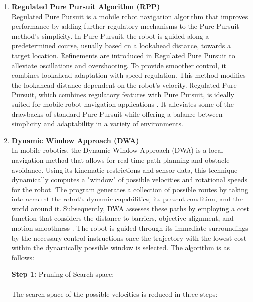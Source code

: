 \documentclass[sigconf]{acmart}
\begin{document}
\begin{enumerate}
    \item \textbf{Regulated Pure Pursuit Algorithm (RPP)}\\
Regulated Pure Pursuit is a mobile robot navigation algorithm that improves performance by adding further regulatory mechanisms to the Pure Pursuit method's simplicity. In Pure Pursuit, the robot is guided along a predetermined course, usually based on a lookahead distance, towards a target location. Refinements are introduced in Regulated Pure Pursuit to alleviate oscillations and overshooting. To provide smoother control, it combines lookahead adaptation with speed regulation. This method modifies the lookahead distance dependent on the robot's velocity. Regulated Pure Pursuit, which combines regulatory features with Pure Pursuit, is ideally suited for mobile robot navigation applications \cite{b15}. It alleviates some of the drawbacks of standard Pure Pursuit while offering a balance between simplicity and adaptability in a variety of environments.\\

\item \textbf{Dynamic Window Approach (DWA)} \\
In mobile robotics, the Dynamic Window Approach (DWA) is a local navigation method that allows for real-time path planning and obstacle avoidance. Using its kinematic restrictions and sensor data, this technique dynamically computes a "window" of possible velocities and rotational speeds for the robot. The program generates a collection of possible routes by taking into account the robot's dynamic capabilities, its present condition, and the world around it. Subsequently, DWA assesses these paths by employing a cost function that considers the distance to barriers, objective alignment, and motion smoothness \cite{b14}. The robot is guided through its immediate surroundings by the necessary control instructions once the trajectory with the lowest cost within the dynamically possible window is selected. The algorithm is as follows:

\textbf{Step 1:} Pruning of Search space: \\ \\
The search space of the possible velocities is reduced in three steps: \\ \\


\end{enumerate}
\end{document}
